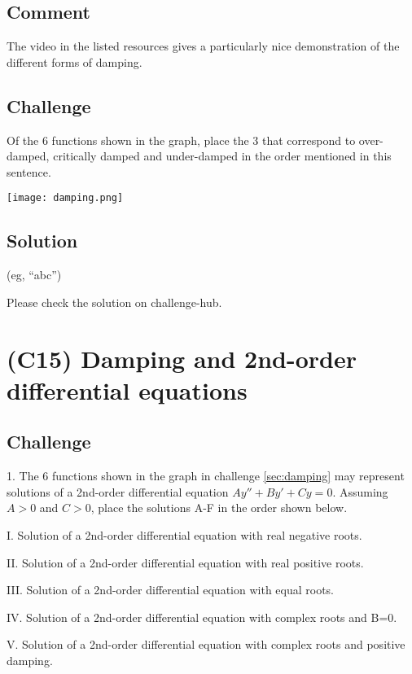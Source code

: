 \subsection*{Comment}
The video in the listed resources gives a particularly nice demonstration of the different forms of damping.

\subsection*{Challenge}
Of the 6 functions shown in the graph, place the 3 that correspond to over-damped, critically damped and under-damped in the order mentioned in this sentence.

\texttt{[image: damping.png]}
\subsection*{Solution}
(eg, ``abc'')

Please check the solution on challenge-hub.




\newpage
\section{(C15) Damping and 2nd-order differential equations} %

\subsection*{Challenge}
1. The 6 functions shown in the graph in challenge \ref{sec:damping} may represent solutions of a 2nd-order differential equation $Ay'' + By' + Cy = 0$. Assuming $A>0$ and $C>0$, place the solutions A-F in the order shown below.%

I. Solution of a 2nd-order differential equation with real negative roots.

II. Solution of a 2nd-order differential equation with real positive roots.

III. Solution of a 2nd-order differential equation with equal roots.

IV. Solution of a 2nd-order differential equation with complex roots and B=0.

V. Solution of a 2nd-order differential equation with complex roots and positive damping.

